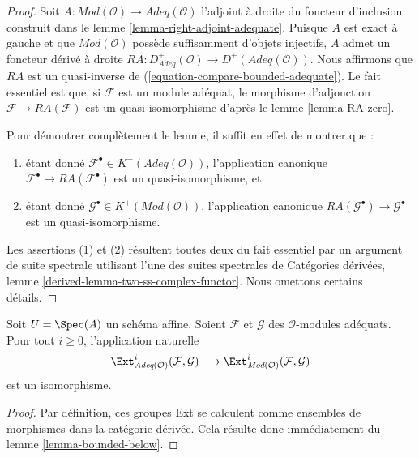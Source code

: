 \begin{proof}
Soit $A : \textit{Mod}(\mathcal{O}) \to \textit{Adeq}(\mathcal{O})$
l'adjoint à droite du foncteur d'inclusion construit dans le
lemme \ref{lemma-right-adjoint-adequate}.
Puisque $A$ est exact à gauche et que $\textit{Mod}(\mathcal{O})$
possède suffisamment d'objets injectifs, $A$ admet un foncteur dérivé à droite
$RA : D^+_{\textit{Adeq}}(\mathcal{O}) \to D^+(\textit{Adeq}(\mathcal{O}))$.
Nous affirmons que $RA$ est un quasi-inverse de
(\ref{equation-compare-bounded-adequate}).
Le fait essentiel est que, si $\mathcal{F}$ est un module adéquat,
le morphisme d'adjonction $\mathcal{F} \to RA(\mathcal{F})$ est un
quasi-isomorphisme d'après le lemme \ref{lemma-RA-zero}.

\medskip\noindent
Pour démontrer complètement le lemme, il suffit en effet de montrer que :
\begin{enumerate}
\item étant donné $\mathcal{F}^\bullet \in K^+(\textit{Adeq}(\mathcal{O}))$,
l'application canonique $\mathcal{F}^\bullet \to RA(\mathcal{F}^\bullet)$
est un quasi-isomorphisme, et
\item étant donné $\mathcal{G}^\bullet \in K^+(\textit{Mod}(\mathcal{O}))$,
l'application canonique $RA(\mathcal{G}^\bullet) \to \mathcal{G}^\bullet$
est un quasi-isomorphisme.
\end{enumerate}
Les assertions (1) et (2) résultent toutes deux du fait essentiel par un argument
de suite spectrale utilisant l'une des suites spectrales de
Catégories dérivées, lemme \ref{derived-lemma-two-ss-complex-functor}.
Nous omettons certains détails.
\end{proof}

\begin{lemma}
\label{lemma-ext-adequate}
Soit $U = \Spec(A)$ un schéma affine.
Soient $\mathcal{F}$ et $\mathcal{G}$ des $\mathcal{O}$-modules adéquats.
Pour tout $i \geq 0$, l'application naturelle
$$
\Ext^i_{\textit{Adeq}(\mathcal{O})}(\mathcal{F}, \mathcal{G})
\longrightarrow
\Ext^i_{\textit{Mod}(\mathcal{O})}(\mathcal{F}, \mathcal{G})
$$
est un isomorphisme.
\end{lemma}

\begin{proof}
Par définition, ces groupes Ext se calculent comme ensembles de morphismes dans
la catégorie dérivée. Cela résulte donc immédiatement du
lemme \ref{lemma-bounded-below}.
\end{proof}









